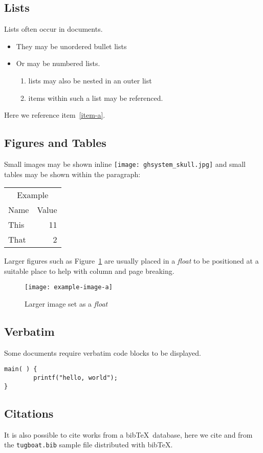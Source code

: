 \documentclass[a4paper,twocolumn]{article}
\providecommand\tagpdfsetup[1]{}
\begin{document}
\subsection{Lists}
Lists
 often occur in documents.
\begin{itemize}
\item They may be unordered bullet lists
\item Or may be numbered lists.
  \begin{enumerate}
  \item lists may also be nested in an outer list
  \item \label{item-a}items within such a list may be referenced.
  \end{enumerate}
\end{itemize}
Here we reference item~\ref{item-a}.

\subsection{Figures and Tables}

Small images may be shown inline
\texttt{[image: ghsystem\_skull.jpg]}
and small tables may be shown within the paragraph:
\begin{center}
\tagpdfsetup{table/header-rows={1,2}}
\begin{tabular}{lr}
\multicolumn{2}{c}{Example}\\
Name&Value\\
This& 11 \\
That & 2
\end{tabular}
\end{center}

Larger figures such as Figure~\ref{float} are usually placed in a
\emph{float} to be positioned at a suitable place to help with column
and page breaking.
\begin{figure}
  \centering
  \texttt{[image: example-image-a]}
  \caption{\label{float}Larger image set as a \emph{float}}
\end{figure}

\subsection{Verbatim}
Some documents require verbatim code blocks to be displayed.
\begin{verbatim}
main( ) {
        printf("hello, world");
}
\end{verbatim}

\subsection{Citations}
It is also possible to cite works from a bib\TeX\ database, here we
cite \cite{Knuth:TB5-1-67} and \cite{Hoekwater:TB28-3-312} from the
\texttt{tugboat.bib} sample file distributed with bib\TeX.


\raggedright

\end{document}

